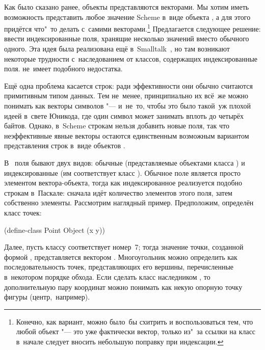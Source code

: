 Как было сказано ранее, объекты {\Meroonet} представляются векторами. Мы хотим
иметь возможность представить любое значение Scheme в~виде объекта {\Meroonet},
а для этого придётся что"~то делать с~самими векторами.\footnote*{Конечно, как
вариант, можно было~бы схитрить и воспользоваться тем, что любой объект
{\Meroonet} "--- это уже фактически вектор, только из"~за ссылки на класс
в~начале следует вносить небольшую поправку при индексации.} Предлагается
следующее решение: ввести индексированные поля, хранящие несколько значений
вместо обычного одного. Эта идея была реализована ещё в~Smalltalk~\cite{gr83},
но там возникают некоторые трудности с~наследованием от классов, содержащих
индексированные поля. {\Meroonet} не~имеет подобного недостатка.

Ещё одна проблема касается строк: ради эффективности они обычно считаются
примитивным типом данных. Тем не~менее, принципиально их всё~же можно понимать
как векторы символов "--- и~не~то, чтобы это было такой~уж плохой идеей в~свете
Юникода, где один символ может занимать вплоть до четырёх байтов. Однако, 
в~Scheme строкам нельзя добавить новые поля, так что неэффективные явные векторы
остаются единственным возможным вариантом представления строк в~виде объектов
{\Meroonet}.

В~{\Meroonet} поля бывают двух видов: обычные (представляемые объектами класса
) и индексированные (им соответствует класс ).
Обычное поле является просто элементом вектора-объекта, тогда как
индексированное реализуется подобно строкам в~Паскале: сначала идёт количество
элементов этого поля, затем собственно элементы. Рассмотрим наглядный пример.
Предположим, определён класс точек:

\begin{code:lisp}
(define-class Point Object (x y))
\end{code:lisp}

Далее, пусть классу  соответствует номер~7; тогда значение точки,
созданной формой , представляется вектором . Многоугольник можно определить как последовательность точек,
представляющих его вершины, перечисленные в~некотором порядке обхода. Если
сделать класс  наследником , то дополнительную пару
координат можно понимать как некую опорную точку фигуры (центр,~например).

